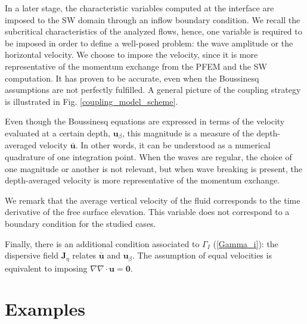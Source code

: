 In a later stage, the characteristic variables computed at the interface are imposed to the SW domain through an inflow boundary condition. We recall the subcritical characteristics of the analyzed flows, hence, one variable is required to be imposed in order to define a well-posed problem: the wave amplitude or the horizontal velocity. 
We choose to impose the velocity, since it is more representative of the momentum exchange from the PFEM and the SW computation. It has proven to be accurate, even when the Boussinesq assumptions are not perfectly fulfilled.
A general picture of the coupling strategy is illustrated in Fig. \ref{coupling_model_scheme}.

Even though the Boussinesq equations are expressed in terms of the velocity evaluated at a certain depth, $\mathbf{u}_\beta$, this magnitude is a measure of the depth-averaged velocity $\bar{\mathbf{u}}$. In other words, it can be understood as a numerical quadrature of one integration point. When the waves are regular, the choice of one magnitude or another is not relevant, but when wave breaking is present, the depth-averaged velocity is more representative of the momentum exchange.

We remark that the average vertical velocity of the fluid corresponds to the time derivative of the free surface elevation. This variable does not correspond to a boundary condition for the studied cases.

Finally, there is an additional condition associated to $\Gamma_I$ (\ref{Gamma_i}): the dispersive field $\mathbf{J}_\eta$ relates $\bar{\mathbf{u}}$ and $\mathbf{u}_\beta$. The assumption of equal velocities is equivalent to imposing $\nabla\nabla\cdot\mathbf{u}=\mathbf{0}$.



\section{Examples}





